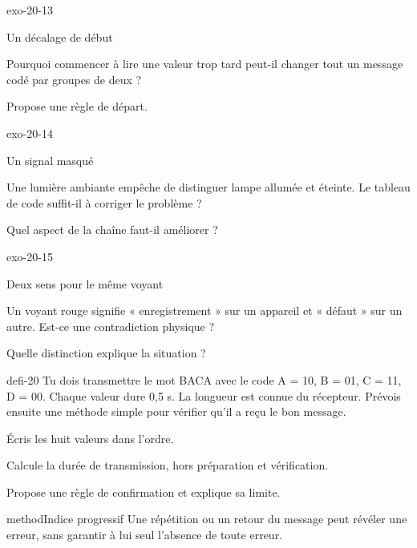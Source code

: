 \documentclass[12pt,twoside,openany]{book}
\begin{document}
\begin{blocLivre}{exo-20-13}
\begin{exercice}[3]{Un décalage de début}
\begin{questions}
\item Pourquoi commencer à lire une valeur trop tard peut-il changer tout un message codé par groupes de deux ?
\item Propose une règle de départ.
\end{questions}
\end{exercice}\end{blocLivre}
\begin{blocLivre}{exo-20-14}
\begin{exercice}[3]{Un signal masqué}
\begin{questions}
\item Une lumière ambiante empêche de distinguer lampe allumée et éteinte. Le tableau de code suffit-il à corriger le problème ?
\item Quel aspect de la chaîne faut-il améliorer ?
\end{questions}
\end{exercice}\end{blocLivre}
\begin{blocLivre}{exo-20-15}
\begin{exercice}[3]{Deux sens pour le même voyant}
\begin{questions}
\item Un voyant rouge signifie « enregistrement » sur un appareil et « défaut » sur un autre. Est-ce une contradiction physique ?
\item Quelle distinction explique la situation ?
\end{questions}
\end{exercice}\end{blocLivre}
\label{defi-ex-20}
\begin{pcFiche}{defi-20}
Tu dois transmettre le mot BACA avec le code A = 10, B = 01, C = 11, D = 00. Chaque valeur dure 0,5 s. La longueur est connue du récepteur. Prévois ensuite une méthode simple pour vérifier qu’il a reçu le bon message.\par
{}
\begin{questions}
\item Écris les huit valeurs dans l’ordre.
\item Calcule la durée de transmission, hors préparation et vérification.
\item Propose une règle de confirmation et explique sa limite.
\end{questions}
\begin{pcEncadre}{method}{Indice progressif}
Une répétition ou un retour du message peut révéler une erreur, sans garantir à lui seul l’absence de toute erreur.\par
\end{pcEncadre}
\end{pcFiche}
\end{document}
